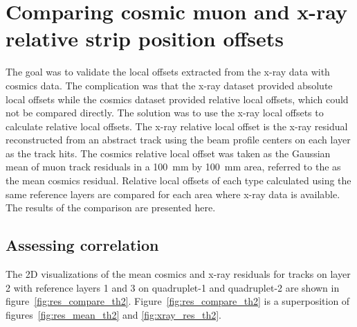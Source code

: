 
\chapter{Comparing cosmic muon and x-ray relative strip position offsets}
\label{chap:comparison}

The goal was to validate the local offsets extracted from the x-ray data with cosmics data. The complication was that the x-ray dataset provided absolute local offsets while the cosmics dataset provided relative local offsets, which could not be compared directly. The solution was to use the x-ray local offsets to calculate relative local offsets. The x-ray relative local offset is the x-ray residual reconstructed from an abstract track using the beam profile centers on each layer as the track hits. The cosmics relative local offset was taken as the Gaussian mean of muon track residuals in a \SI{100}{mm} by \SI{100}{mm} area, referred to the as the mean cosmics residual. Relative local offsets of each type calculated using the same reference layers are compared for each area where x-ray data is available. The  results of the comparison are presented here.



\section{Assessing correlation}
\label{sec:assessing_correlation}

The 2D visualizations of the mean cosmics and x-ray residuals for tracks on layer 2 with reference layers 1 and 3 on quadruplet-1 and quadruplet-2 are shown in figure~\ref{fig:res_compare_th2}. Figure~\ref{fig:res_compare_th2} is a superposition of figures~\ref{fig:res_mean_th2} and \ref{fig:xray_res_th2}.

